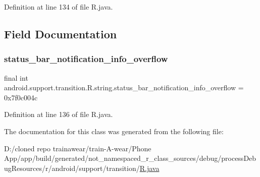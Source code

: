 Definition at line 134 of file R.\+java.


\begin{DoxyCode}{0}

\end{DoxyCode}


\subsection{Field Documentation}
\mbox{\label{classandroid_1_1support_1_1transition_1_1_r_1_1string_af545e59339bc447d1f12b77542fae31f}} 
\subsubsection{\texorpdfstring{status\_bar\_notification\_info\_overflow}{status\_bar\_notification\_info\_overflow}}
{\footnotesize\ttfamily final int android.\+support.\+transition.\+R.\+string.\+status\+\_\+bar\+\_\+notification\+\_\+info\+\_\+overflow = 0x7f0c004c\hspace{0.3cm}{\ttfamily [static]}}



Definition at line 136 of file R.\+java.



The documentation for this class was generated from the following file\+:\begin{DoxyCompactItemize}
\item 
D\+:/cloned repo trainawear/train-\/\+A-\/wear/\+Phone App/app/build/generated/not\+\_\+namespaced\+\_\+r\+\_\+class\+\_\+sources/debug/process\+Debug\+Resources/r/android/support/transition/\mbox{\hyperlink{process_debug_resources_2r_2android_2support_2transition_2_r_8java}{R.\+java}}\end{DoxyCompactItemize}
